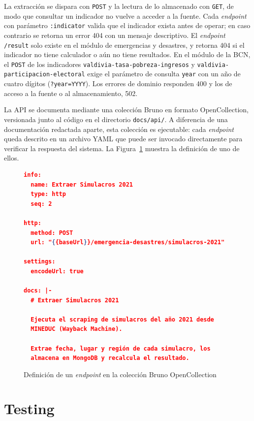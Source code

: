 \documentclass[12pt,letterpaper,oneside]{report}
\begin{document}
La extracci\'on se dispara con \texttt{POST} y la lectura de lo almacenado con \texttt{GET}, de modo que consultar un indicador no vuelve a acceder a la fuente. Cada \textit{endpoint} con par\'ametro \texttt{:indicator} valida que el indicador exista antes de operar; en caso contrario se retorna un error 404 con un mensaje descriptivo. El \textit{endpoint} \texttt{/result} solo existe en el m\'odulo de emergencias y desastres, y retorna 404 si el indicador no tiene calculador o a\'un no tiene resultados. En el m\'odulo de la BCN, el \texttt{POST} de los indicadores \texttt{valdivia-\allowbreak tasa-\allowbreak pobreza-\allowbreak ingresos} y \texttt{valdivia-\allowbreak participacion-\allowbreak electoral} exige el par\'ametro de consulta \texttt{year} con un a\~no de cuatro d\'igitos (\texttt{?year=YYYY}). Los errores de dominio responden 400 y los de acceso a la fuente o al almacenamiento, 502.

La API se documenta mediante una colecci\'on Bruno \parencite{bruno} en formato OpenCollection, versionada junto al c\'odigo en el directorio \texttt{docs/api/}. A diferencia de una documentaci\'on redactada aparte, esta colecci\'on es ejecutable: cada \textit{endpoint} queda descrito en un archivo YAML que puede ser invocado directamente para verificar la respuesta del sistema. La Figura~\ref{fig:bruno-collection} muestra la definici\'on de uno de ellos.

\begin{figure}[H]
\begin{lstlisting}[style=codigo, language=JSON]
info:
  name: Extraer Simulacros 2021
  type: http
  seq: 2

http:
  method: POST
  url: "{{baseUrl}}/emergencia-desastres/simulacros-2021"

settings:
  encodeUrl: true

docs: |-
  # Extraer Simulacros 2021

  Ejecuta el scraping de simulacros del año 2021 desde
  MINEDUC (Wayback Machine).

  Extrae fecha, lugar y región de cada simulacro, los
  almacena en MongoDB y recalcula el resultado.
\end{lstlisting}
\caption{Definici\'on de un \textit{endpoint} en la colecci\'on Bruno OpenCollection}
\label{fig:bruno-collection}
\end{figure}

\section{Testing}
\label{sec:testing}
\end{document}
